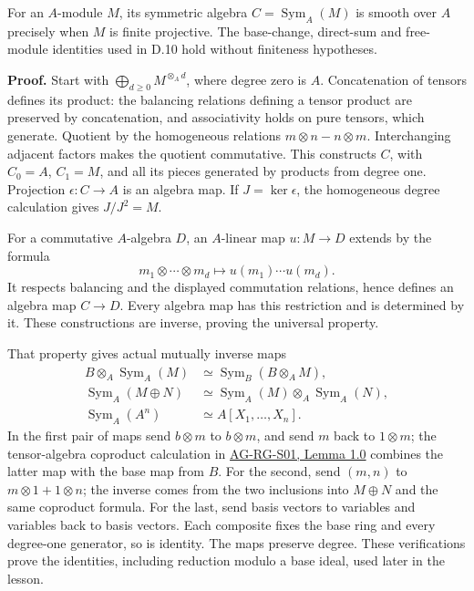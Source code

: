 \documentclass[11pt,a4paper,openany]{report}
\begin{document}
For an \(A\)-module \(M\), its symmetric algebra \(C=\operatorname{Sym}_A(M)\) is smooth over \(A\) precisely when \(M\) is finite projective. The base-change, direct-sum and free-module identities used in D.10 hold without finiteness hypotheses.

\textbf{Proof.} Start with \(\bigoplus_{d\geq0}M^{\otimes_A d}\), where degree zero is \(A\). Concatenation of tensors defines its product: the balancing relations defining a tensor product are preserved by concatenation, and associativity holds on pure tensors, which generate. Quotient by the homogeneous relations \(m\otimes n-n\otimes m\). Interchanging adjacent factors makes the quotient commutative. This constructs \(C\), with \(C_0=A\), \(C_1=M\), and all its pieces generated by products from degree one. Projection \(\epsilon:C\to A\) is an algebra map. If \(J=\ker\epsilon\), the homogeneous degree calculation gives \(J/J^2=M\).

For a commutative \(A\)-algebra \(D\), an \(A\)-linear map \(u:M\to D\) extends by the formula \[m_1\otimes\cdots\otimes m_d\longmapsto u(m_1)\cdots u(m_d).\] It respects balancing and the displayed commutation relations, hence defines an algebra map \(C\to D\). Every algebra map has this restriction and is determined by it. These constructions are inverse, proving the universal property.

That property gives actual mutually inverse maps \[\begin{aligned}
B\otimes_A\operatorname{Sym}_A(M)&\simeq\operatorname{Sym}_B(B\otimes_A M),\\
\operatorname{Sym}_A(M\oplus N)&\simeq\operatorname{Sym}_A(M)\otimes_A\operatorname{Sym}_A(N),\\
\operatorname{Sym}_A(A^n)&\simeq A[X_1,\ldots,X_n].
\end{aligned}\] In the first pair of maps send \(b\otimes m\) to \(b\otimes m\), and send \(m\) back to \(1\otimes m\); the tensor-algebra coproduct calculation in \href{https://github.com/KokunoYumeto/open-math-courses/blob/main/docs/courses/AG-RG/AG-RG-S01.md\#1-the-algebra-of-localization}{AG-RG-S01, Lemma 1.0} combines the latter map with the base map from \(B\). For the second, send \((m,n)\) to \(m\otimes1+1\otimes n\); the inverse comes from the two inclusions into \(M\oplus N\) and the same coproduct formula. For the last, send basis vectors to variables and variables back to basis vectors. Each composite fixes the base ring and every degree-one generator, so is identity. The maps preserve degree. These verifications prove the identities, including reduction modulo a base ideal, used later in the lesson.
\end{document}
